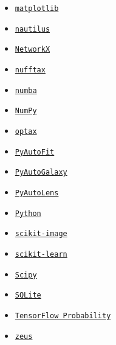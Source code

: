 \begin{itemize}
\item
\href{https://github.com/matplotlib/matplotlib}{\texttt{matplotlib}}
\citep{matplotlib}

\item
\href{https://github.com/johannesulf/nautilus}{\texttt{nautilus}}
\citep{nautilus}

\item
\href{https://github.com/networkx/networkx}{\texttt{NetworkX}}
\citep{networkx}

\item
\href{https://github.com/GragasLab/nufftax}{\texttt{nufftax}}
\citep{nufftax, finufft}

\item
\href{https://github.com/numba/numba}{\texttt{numba}}
\citep{numba}

\item
\href{https://github.com/numpy/numpy}{\texttt{NumPy}}
\citep{numpy}

\item
\href{https://github.com/google-deepmind/optax}{\texttt{optax}}
\citep{optax}

\item
\href{https://github.com/PyAutoLabs/PyAutoFit}{\texttt{PyAutoFit}}
\citep{pyautofit}

\item
\href{https://github.com/PyAutoLabs/PyAutoGalaxy}{\texttt{PyAutoGalaxy}}
\citep{Nightingale2018, pyautogalaxy}

\item
\href{https://github.com/PyAutoLabs/PyAutoLens}{\texttt{PyAutoLens}}
\citep{Nightingale2015, Nightingale2018, pyautolens}

\item
\href{https://www.python.org/}{\texttt{Python}}
\citep{python}

\item
\href{https://github.com/scikit-image/scikit-image}{\texttt{scikit-image}}
\citep{scikit-image}

\item
\href{https://github.com/scikit-learn/scikit-learn}{\texttt{scikit-learn}}
\citep{scikit-learn}

\item
\href{https://github.com/scipy/scipy}{\texttt{Scipy}}
\citep{scipy}

\item
\href{https://www.sqlite.org/index.html}{\texttt{SQLite}}
\citep{sqlite}

\item
\href{https://github.com/tensorflow/probability}{\texttt{TensorFlow Probability}}
\citep{tfp}

\item
\href{https://github.com/minaskar/zeus}{\texttt{zeus}}
\citep{zeus1, zeus2}

\end{itemize}
